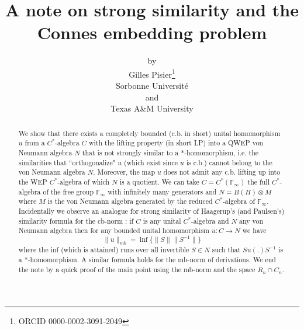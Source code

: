 \documentclass[11pt,leqno]{article}
\newcommand{\bb}[1]{\mathbb{#1}}
\newcommand{\cl}[1]{\mathcal{#1}}
\newcommand{\ovl}{\overline}
\theoremstyle{plain}
\theoremstyle{definition}
\theoremstyle{remark}
\numberwithin{equation}{section}
\def\F{\bb F}
\def\F{\bb F}
\begin{document}

 


 \thispagestyle{empty}
 
 



 
\setcounter{page}{1}
 
 
 
\newtheorem{ass}{}

 \def\ovl{\overline}
 \def\U{\cl U}
 
   
      
      \def\l{\ell}
      
       \title{A note on strong similarity and the Connes embedding problem}
  
  
  
\author{by\\
Gilles  Pisier\footnote{ORCID    0000-0002-3091-2049}   \\
Sorbonne Universit\'e\\
and\\ Texas  A\&M  University}

 \maketitle
      
      \begin{abstract} We show that there exists a completely bounded (c.b. in short) unital homomorphism $u$
from a $C^*$-algebra $C$ with the lifting property (in short LP) into a QWEP von Neumann algebra $N$
that is not strongly similar to a $*$-homomorphism, i.e.
      the similarities that ``orthogonalize" $u$  (which exist since $u$ is c.b.)  cannot belong  to
       the von Neumann algebra $N$.
       Moreover, the map $u$ does not admit any c.b. lifting up into the WEP $C^*$-algebra
       of which $N$ is a quotient.  We can take   $C=C^*(\F_\infty)$ the full $C^*$-algebra of the free group $\F_\infty$ with 
infinitely many generators   and $N= B(H)\bar \otimes M$ where $M$ is the 
von Neumann algebra generated by the reduced $C^*$-algebra of $\F_\infty$. Incidentally we observe an analogue
for strong similarity  of Haagerup's (and Paulsen's) similarity formula for the cb-norm  : if $C$ is any
unital $C^*$-algebra and $N$ any von Neumann algebra then for any bounded unital homomorphism
$u: C \to N$ we have
$$\|u\|_{mb}= \inf\{ \|S\|\|S^{-1}\| \}$$
where the inf (which is attained) runs over all invertible $S\in N$ such that  $S u(.) S^{-1}$ is   a $*$-homomorphism. A similar formula holds for the mb-norm of  derivations. We end the note by a quick proof of the main point
using the mb-norm and the space $R_n\cap C_n$.
  \end{abstract} 
\end{document}
